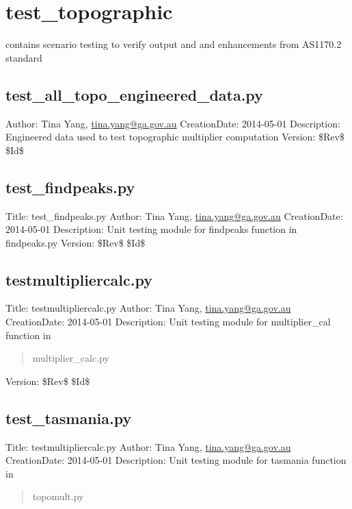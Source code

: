 \documentclass[letterpaper,10pt,english]{sphinxmanual}
\begin{document}
\section{test\_topographic}
\label{docs/tests:test-topographic}
contains scenario testing to verify output and and enhancements from AS1170.2 standard


\subsection{test\_all\_topo\_engineered\_data.py}
\label{docs/tests:module-test_topographic.test_all_topo_engineered_data}\label{docs/tests:test-all-topo-engineered-data-py}
Author: Tina Yang, \href{mailto:tina.yang@ga.gov.au}{tina.yang@ga.gov.au} 
CreationDate: 2014-05-01
Description: Engineered data used to test topographic multiplier computation 
Version: \$Rev\$ 
\$Id\$


\subsection{test\_findpeaks.py}
\label{docs/tests:test-findpeaks-py}\label{docs/tests:module-test_topographic.test_findpeaks}
Title: test\_findpeaks.py 
Author: Tina Yang, \href{mailto:tina.yang@ga.gov.au}{tina.yang@ga.gov.au} 
CreationDate: 2014-05-01
Description: Unit testing module for findpeaks function in findpeaks.py 
Version: \$Rev\$ 
\$Id\$


\subsection{testmultipliercalc.py}
\label{docs/tests:module-test_topographic.testmultipliercalc}\label{docs/tests:testmultipliercalc-py}
Title: testmultipliercalc.py 
Author: Tina Yang, \href{mailto:tina.yang@ga.gov.au}{tina.yang@ga.gov.au} 
CreationDate: 2014-05-01
Description: Unit testing module for multiplier\_cal function in
\begin{quote}

multiplier\_calc.py
\end{quote}

Version: \$Rev\$ 
\$Id\$


\subsection{test\_tasmania.py}
\label{docs/tests:test-tasmania-py}\label{docs/tests:module-test_topographic.test_tasmania}
Title: testmultipliercalc.py 
Author: Tina Yang, \href{mailto:tina.yang@ga.gov.au}{tina.yang@ga.gov.au} 
CreationDate: 2014-05-01
Description: Unit testing module for tasmania function in
\begin{quote}

topomult.py
\end{quote}
\end{document}
